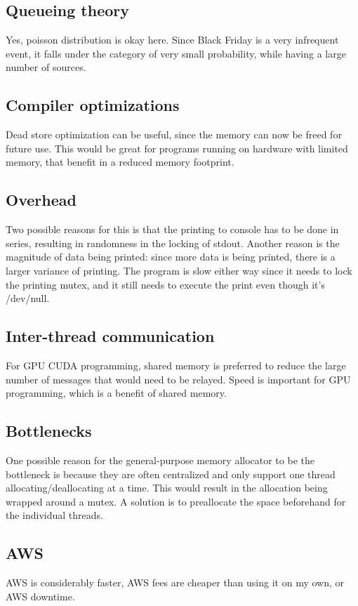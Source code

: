 \documentclass[12pt]{article}
\begin{document}
\subsection{Queueing theory}
Yes, poisson distribution is okay here.
Since Black Friday is a very infrequent event, it falls under the category of very small probability, while having a large number of sources.

\subsection{Compiler optimizations}
Dead store optimization can be useful, since the memory can now be freed for future use.
This would be great for programs running on hardware with limited memory, that benefit in a reduced memory footprint.

\subsection{Overhead}
Two possible reasons for this is that the printing to console has to be done in series, resulting in randomness in the locking of stdout.
Another reason is the magnitude of data being printed: since more data is being printed, there is a larger variance of printing.
The program is slow either way since it needs to lock the printing mutex, and it still needs to execute the print even though it's /dev/null.

\subsection{Inter-thread communication}
For GPU CUDA programming, shared memory is preferred to reduce the large number of messages that would need to be relayed.
Speed is important for GPU programming, which is a benefit of shared memory.

\subsection{Bottlenecks}
One possible reason for the general-purpose memory allocator to be the bottleneck is because they are often centralized and only support one thread allocating/deallocating at a time.
This would result in the allocation being wrapped around a mutex.
A solution is to preallocate the space beforehand for the individual threads.

\subsection{AWS}
AWS is considerably faster, AWS fees are cheaper than using it on my own, or AWS downtime.
\end{document}
